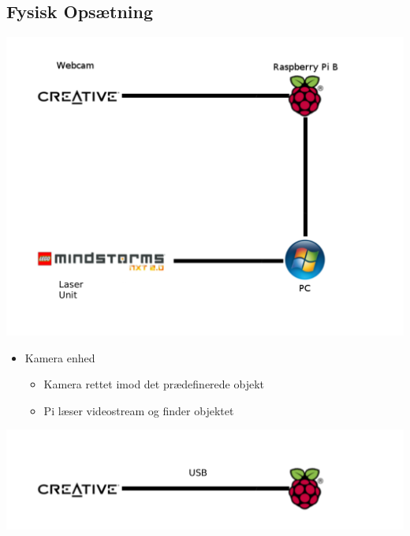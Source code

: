 \subsection{Fysisk Opsætning}
\begin{frame}[fragile]{\insertsection}{\insertsubsection}
\includegraphics[width=1\textwidth]{pictures/overblik.pdf}
\end{frame}

\begin{frame}[fragile]{\insertsection}{\insertsubsection}
\begin{itemize}
	\item Kamera enhed
		\begin{itemize}
			\item Kamera rettet imod det prædefinerede objekt
			\item Pi læser videostream og finder objektet
		\end{itemize}
\end{itemize}
\includegraphics[width=1\textwidth]{pictures/kampi.pdf}
\end{frame}

